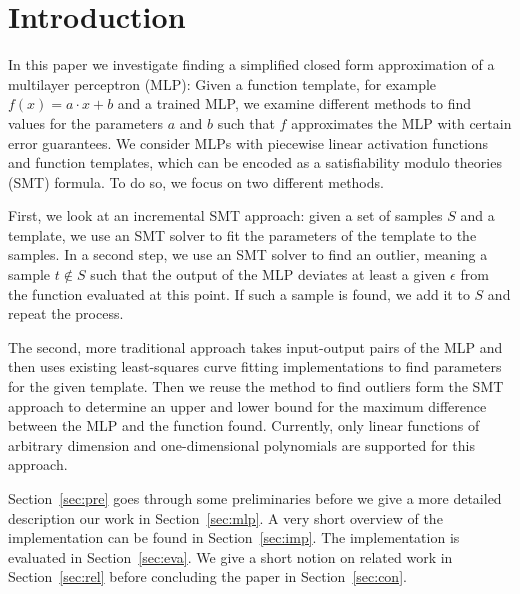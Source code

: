 \section{Introduction}
In this paper we investigate finding a simplified closed form approximation of a multilayer perceptron (MLP): Given a function template, for example $f(x) = a \cdot x + b$ and a trained MLP, we examine different methods to find values for the parameters $a$ and $b$ such that $f$ approximates the MLP with certain error guarantees. We consider MLPs with piecewise linear activation functions and function templates, which can be encoded as a satisfiability modulo theories (SMT) formula. To do so, we focus on two different methods.
\par
First, we look at an incremental SMT approach: given a set of samples $S$ and a template, we use an SMT solver to fit the parameters of the template to the samples. In a second step, we use an SMT solver to find an outlier, meaning a sample $t \notin S$ such that the output of the MLP deviates at least a given $\epsilon$ from the function evaluated at this point. If such a sample is found, we add it to $S$ and repeat the process.\par
\par
The second, more traditional approach takes input-output pairs of the MLP and then uses existing least-squares curve fitting implementations to find parameters for the given template. Then we reuse the method to find outliers form the SMT approach to determine an upper and lower bound for the maximum difference between the MLP and the function found. Currently, only linear functions of arbitrary dimension and one-dimensional polynomials are supported for this approach.
\par
Section~\ref{sec:pre} goes through some preliminaries before we give a more detailed description our work in Section~\ref{sec:mlp}. A very short overview of the implementation can be found in Section~\ref{sec:imp}. The implementation is evaluated in Section~\ref{sec:eva}. We give a short notion on related work in Section~\ref{sec:rel} before concluding the paper in Section~\ref{sec:con}.